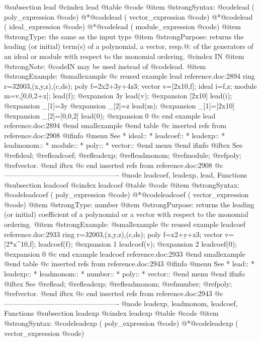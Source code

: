 {@subsection lead
@cindex lead
@table @code
@item @strong{Syntax:}
@code{lead (} poly_expression @code{)}
@*@code{lead (} vector_expression @code{)}
@*@code{lead (} ideal_expression @code{)}
@*@code{lead (} module_expression @code{)}
@item @strong{Type:}
the same as the input type
@item @strong{Purpose:}
returns the leading (or initial) term(s) of a polynomial, a vector,
resp.@: of the generators of an ideal or module with respect
to the monomial ordering.
@cindex IN
@item @strong{Note:}
@code{IN} may be used instead of @code{lead}.
@item @strong{Example:}
@smallexample
@c reused example lead reference.doc:2894 
  ring r=32003,(x,y,z),(c,ds);
  poly f=2x2+3y+4z3;
  vector v=[2x10,f];
  ideal i=f,z;
  module m=v,[0,0,2+x];
  lead(f);
@expansion{} 3y
  lead(v);
@expansion{} [2x10]
  lead(i);
@expansion{} _[1]=3y
@expansion{} _[2]=z
  lead(m);
@expansion{} _[1]=[2x10]
@expansion{} _[2]=[0,0,2]
  lead(0);
@expansion{} 0
@c end example lead reference.doc:2894
@end smallexample
@end table
@c inserted refs from reference.doc:2908
@ifinfo
@menu
See
* ideal::
* leadcoef::
* leadexp::
* leadmonom::
* module::
* poly::
* vector::
@end menu
@end ifinfo
@iftex
See
@ref{ideal};
@ref{leadcoef};
@ref{leadexp};
@ref{leadmonom};
@ref{module};
@ref{poly};
@ref{vector}.
@end iftex
@c end inserted refs from reference.doc:2908
@c -------------------------------------------------
@node leadcoef, leadexp, lead, Functions
@subsection leadcoef
@cindex leadcoef
@table @code
@item @strong{Syntax:}
@code{leadcoef (} poly_expression @code{)}
@*@code{leadcoef (} vector_expression @code{)}
@item @strong{Type:}
number
@item @strong{Purpose:}
returns the leading (or initial) coefficient of a polynomial or a vector
with respect to the monomial ordering.
@item @strong{Example:}
@smallexample
@c reused example leadcoef reference.doc:2933 
  ring r=32003,(x,y,z),(c,ds);
  poly f=x2+y+z3;
  vector v=[2*x^10,f];
  leadcoef(f);
@expansion{} 1
  leadcoef(v);
@expansion{} 2
  leadcoef(0);
@expansion{} 0
@c end example leadcoef reference.doc:2933
@end smallexample
@end table
@c inserted refs from reference.doc:2943
@ifinfo
@menu
See
* lead::
* leadexp::
* leadmonom::
* number::
* poly::
* vector::
@end menu
@end ifinfo
@iftex
See
@ref{lead};
@ref{leadexp};
@ref{leadmonom};
@ref{number};
@ref{poly};
@ref{vector}.
@end iftex
@c end inserted refs from reference.doc:2943
@c -------------------------------------------------
@node leadexp, leadmonom, leadcoef, Functions
@subsection leadexp
@cindex leadexp
@table @code
@item @strong{Syntax:}
@code{leadexp (} poly_expression @code{)}
@*@code{leadexp (} vector_expression @code{)}
}
